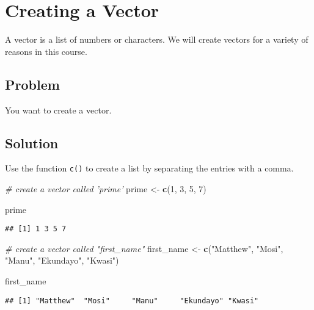 \documentclass[]{book}
\newenvironment{Shaded}{\begin{snugshade}}{\end{snugshade}}
\newcommand{\KeywordTok}[1]{\textcolor[rgb]{0.13,0.29,0.53}{\textbf{{#1}}}}
\newcommand{\DecValTok}[1]{\textcolor[rgb]{0.00,0.00,0.81}{{#1}}}
\newcommand{\StringTok}[1]{\textcolor[rgb]{0.31,0.60,0.02}{{#1}}}
\newcommand{\CommentTok}[1]{\textcolor[rgb]{0.56,0.35,0.01}{\textit{{#1}}}}
\newcommand{\NormalTok}[1]{{#1}}
\begin{document}
\section{Creating a Vector}\label{creating-a-vector}

A vector is a list of numbers or characters. We will create vectors for
a variety of reasons in this course.

\subsection{Problem}\label{problem-2}

You want to create a vector.

\subsection{Solution}\label{solution-2}

Use the function \texttt{c()} to create a list by separating the entries
with a comma.

\begin{Shaded}
\begin{Highlighting}[]
\CommentTok{# create a vector called 'prime'}
\NormalTok{prime <-}\StringTok{ }\KeywordTok{c}\NormalTok{(}\DecValTok{1}\NormalTok{, }\DecValTok{3}\NormalTok{, }\DecValTok{5}\NormalTok{, }\DecValTok{7}\NormalTok{)}

\NormalTok{prime}
\end{Highlighting}
\end{Shaded}

\begin{verbatim}
## [1] 1 3 5 7
\end{verbatim}

\begin{Shaded}
\begin{Highlighting}[]
\CommentTok{# create a vector called "first_name"}
\NormalTok{first_name <-}\StringTok{ }\KeywordTok{c}\NormalTok{(}\StringTok{"Matthew"}\NormalTok{, }\StringTok{"Mosi"}\NormalTok{, }\StringTok{"Manu"}\NormalTok{, }\StringTok{"Ekundayo"}\NormalTok{, }\StringTok{"Kwasi"}\NormalTok{)}

\NormalTok{first_name}
\end{Highlighting}
\end{Shaded}

\begin{verbatim}
## [1] "Matthew"  "Mosi"     "Manu"     "Ekundayo" "Kwasi"
\end{verbatim}
\end{document}
